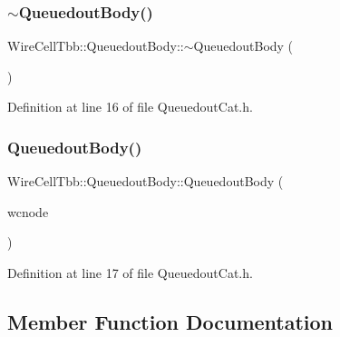 \subsubsection{\texorpdfstring{$\sim$\+Queuedout\+Body()}{~QueuedoutBody()}}
{\footnotesize\ttfamily Wire\+Cell\+Tbb\+::\+Queuedout\+Body\+::$\sim$\+Queuedout\+Body (\begin{DoxyParamCaption}{ }\end{DoxyParamCaption})\hspace{0.3cm}{\ttfamily [inline]}}



Definition at line 16 of file Queuedout\+Cat.\+h.

\mbox{\label{class_wire_cell_tbb_1_1_queuedout_body_a46f5320cd0ac14d1a42738dcc5e5ba65}} 
\subsubsection{\texorpdfstring{Queuedout\+Body()}{QueuedoutBody()}}
{\footnotesize\ttfamily Wire\+Cell\+Tbb\+::\+Queuedout\+Body\+::\+Queuedout\+Body (\begin{DoxyParamCaption}\item[{\hyperlink{class_wire_cell_1_1_interface_a09c548fb8266cfa39afb2e74a4615c37}{Wire\+Cell\+::\+I\+Node\+::pointer}}]{wcnode }\end{DoxyParamCaption})\hspace{0.3cm}{\ttfamily [inline]}}



Definition at line 17 of file Queuedout\+Cat.\+h.



\subsection{Member Function Documentation}
\mbox{\label{class_wire_cell_tbb_1_1_queuedout_body_abce2369209a7a6834ec39deaa9e2cafd}} 
